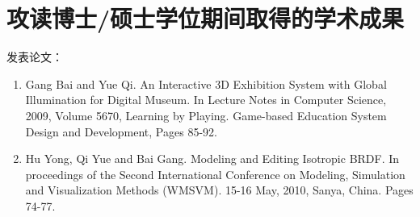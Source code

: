 \chapter{攻读博士/硕士学位期间取得的学术成果}
\noindent 发表论文：
\begin{enumerate}

\item
Gang Bai and Yue Qi. An Interactive 3D Exhibition System with
 Global Illumination for Digital Museum. In Lecture Notes in
 Computer Science, 2009, Volume 5670, Learning by Playing.
Game-based Education System Design and Development, Pages 85-92.

\item
Hu Yong, Qi Yue and Bai Gang. Modeling and Editing Isotropic BRDF.
In proceedings of the Second International Conference on Modeling,
Simulation and Visualization Methods (WMSVM). 15-16 May, 2010,
Sanya, China. Pages 74-77.

\end{enumerate}

